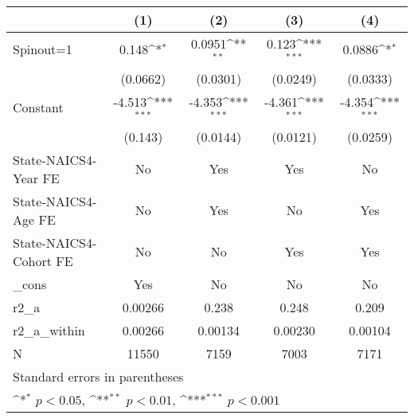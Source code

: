 {
\def\sym#1{\ifmmode^{#1}\else\(^{#1}\)\fi}
\begin{tabular}{l*{4}{c}}
\hline\hline
                    &\multicolumn{1}{c}{(1)}         &\multicolumn{1}{c}{(2)}         &\multicolumn{1}{c}{(3)}         &\multicolumn{1}{c}{(4)}         \\
\hline
Spinout=1           &       0.148\sym{*}  &      0.0951\sym{**} &       0.123\sym{***}&      0.0886\sym{*}  \\
                    &    (0.0662)         &    (0.0301)         &    (0.0249)         &    (0.0333)         \\
[1em]
Constant            &      -4.513\sym{***}&      -4.353\sym{***}&      -4.361\sym{***}&      -4.354\sym{***}\\
                    &     (0.143)         &    (0.0144)         &    (0.0121)         &    (0.0259)         \\
[1em]
State-NAICS4-Year FE&          No         &         Yes         &         Yes         &          No         \\
[1em]
State-NAICS4-Age FE &          No         &         Yes         &          No         &         Yes         \\
[1em]
State-NAICS4-Cohort FE&          No         &          No         &         Yes         &         Yes         \\
[1em]
\_cons              &         Yes         &          No         &          No         &          No         \\
\hline
r2\_a                &     0.00266         &       0.238         &       0.248         &       0.209         \\
r2\_a\_within         &     0.00266         &     0.00134         &     0.00230         &     0.00104         \\
N                   &       11550         &        7159         &        7003         &        7171         \\
\hline\hline
\multicolumn{5}{l}{\footnotesize Standard errors in parentheses}\\
\multicolumn{5}{l}{\footnotesize \sym{*} \(p<0.05\), \sym{**} \(p<0.01\), \sym{***} \(p<0.001\)}\\
\end{tabular}
}

